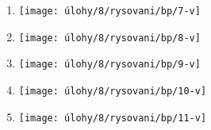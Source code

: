 \begin{enumerate}
\begin{minipage}[t]{\linewidth}
    \end{minipage}

    \item
    \begin{minipage}[t]{\linewidth}
        \begin{quote}
            \phantom{text}
        \end{quote}
        \centering
        \texttt{[image: úlohy/8/rysovani/bp/7-v]}

    \end{minipage}

    \item
    \begin{minipage}[t]{\linewidth}
        \begin{quote}
            \phantom{text}
        \end{quote}
        \centering
        \texttt{[image: úlohy/8/rysovani/bp/8-v]}

    \end{minipage}

    \item
    \begin{minipage}[t]{\linewidth}
        \begin{quote}
            \phantom{text}
        \end{quote}
        \centering
        \texttt{[image: úlohy/8/rysovani/bp/9-v]}

    \end{minipage}

    \item
    \begin{minipage}[t]{\linewidth}
        \begin{quote}
            \phantom{text}
        \end{quote}
        \centering
        \texttt{[image: úlohy/8/rysovani/bp/10-v]}

    \end{minipage}

    \item
    \begin{minipage}[t]{\linewidth}
        \begin{quote}
            \phantom{text}
        \end{quote}
        \centering
        \texttt{[image: úlohy/8/rysovani/bp/11-v]}

    \end{minipage}
\end{enumerate}


